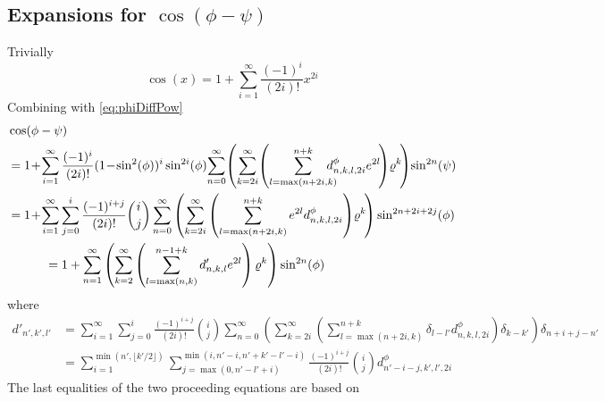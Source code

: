 \documentclass[a4paper]{amsart}
\begin{document}
\subsection{Expansions for $\cos(\phi-\psi)$}
Trivially
\begin{equation}
\cos(x) = 1 + \sum_{i=1}^\infty\frac{(-1)^i}{(2i)!}x^{2i}%
\end{equation}
Combining with \eqref{eq:phiDiffPow}
\begin{align}
\nonumber&\cos(\phi-\psi)\\
\nonumber&=1\!+\!\sum_{i=1}^\infty\frac{(-1)^i}{(2i)!}(1\!-\!\sin^2(\phi))^i\sin^{2i}(\phi)\!\sum_{n=0}^\infty \!\left(\sum_{k=2i}^\infty\!\left(\sum_{l=\max(n+2i,k)}^{n+k}\!\!\!\!\!\! d^\phi_{n,k,l,2i}e^{2l}\!\right)\!\varrho^k\!\right)\!\sin^{2n}(\psi)\\
\nonumber&=1\!+\!\sum_{i=1}^\infty\sum_{j=0}^i\frac{(-1)^{i+j}}{(2i)!}\binom{i}{j}\sum_{n=0}^\infty\left(\sum_{k=2i}^\infty\left(\sum_{l=\max(n+2i,k)}^{n+k} e^{2l}d^\phi_{n,k,l,2i}\right)\!\varrho^k\!\right)\sin^{2n+2i+2j}(\phi)\\
\raisetag{-9mm}\label{eq:cosDiff}&\quad\quad\quad=1 + \sum_{n=1}^\infty\left(\sum_{k=2}^\infty\left(\sum_{l=\max(n,k)}^{n-1+k} d'_{n,k,l}e^{2l}\right)\varrho^k\right)\sin^{2n}(\phi)
\end{align}
where
\begin{align*}
d'_{n',k',l'}&=\sum_{i=1}^\infty\sum_{j=0}^i\!\frac{(-1)^{i+j}}{(2i)!}\binom{i}{j}\!\sum_{n=0}^\infty\!\left(\sum_{k=2i}^\infty\left(\sum_{l=\max(n+2i,k)}^{n+k}\!\!\!\!\! \delta_{l-l'}d^\phi_{n,k,l,2i}\!\right)\!\delta_{k-k'}\!\right)\!\delta_{n+i+j-n'}\\
%
&=\sum_{i=1}^{\min(n',\lfloor k'/2 \rfloor)}\sum_{j=\max(0,n'-l'+i)}^{\min(i,n'-i,n'+k'-l'-i)}\frac{(-1)^{i+j}}{(2i)!}\binom{i}{j}d^\phi_{n'-i-j,k',l',2i}
\end{align*}
The last equalities of the two proceeding equations are based on
\end{document}
